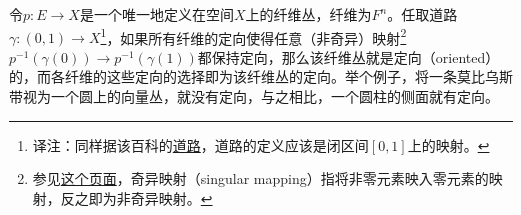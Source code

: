 



令$p: E\to X$是一个唯一地定义在空间$X$上的纤维丛，纤维为$F^n$。任取道路$\gamma: (0, 1)\to X$\footnote{译注：同样据该百科的\href{https://encyclopediaofmath.org/wiki/Path}{道路}，道路的定义应该是闭区间$[0, 1]$上的映射。}，如果所有纤维的定向使得任意（非奇异）映射\footnote{参见\href{https://solitaryroad.com/c218.html}{这个页面}，奇异映射（singular mapping）指将非零元素映入零元素的映射，反之即为非奇异映射。}$p^{-1}(\gamma(0))\to p^{-1}(\gamma(1))$都保持定向，那么该纤维丛就是定向（oriented）的，而各纤维的这些定向的选择即为该纤维丛的定向。举个例子，将一条莫比乌斯带视为一个圆上的向量丛，就没有定向，与之相比，一个圆柱的侧面就有定向。






